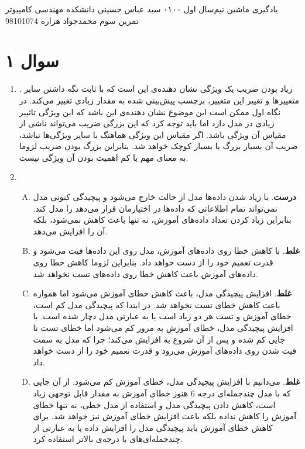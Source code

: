 \documentclass[a4paper, 12pt]{article}
\begin{document}
\handout
{یادگیری ماشین}
{نیم‌سال اول ۰۱\lr{-}۰۰}
{سید عباس حسینی}
{دانشکده مهندسی کامپیوتر}
{تمرین سوم}
{محمد‌جواد هزاره}
{98101074}
\noindent
\\ [-5em]
\section*{سوال ۱}
\begin{enumerate}
	\item \textbf{}.
	زیاد بودن ضریب یک ویژگی نشان دهنده‌ی این است که با ثابت نگه داشتن سایر متغییرها و تغییر این متغییر، برچسب پیش‌بینی شده به مقدار زیادی تغییر می‌کند. در نگاه اول ممکن است این موضوع نشان دهنده‌ی این باشد که این ویژگی تاثییر زیادی در مدل دارد اما باید توجه کرد که این بزرگی ضریب می‌تواند ناشی از مقیاس آن ویژگی باشد. اگر مقیاس این ویژگی هماهنگ با سایر ویژگی‌ها نباشد، ضریب آن بسیار بزرگ یا بسیار کوچک خواهد شد. بنابراین بزرگ بودن ضریب لزوما به معنای مهم یا کم‌ اهمیت بودن آن ویژگی نیست.
	\item
	\begin{enumerate}[A)]
		\item \textbf{درست}.
		با زیاد شدن داده‌ها مدل از حالت  خارج می‌شود و پیچیدگی کنونی مدل نمی‌تواند تمام اطلاعاتی که داده‌ها در اختیارمان قرار می‌دهد را مدل کند. بنابراین زیاد کردن تعداد داده‌های آموزش، نه تنها باعث کاهش  نمی‌شود، بلکه آن را افزایش می‌دهد.
		\item \textbf{غلط}.
		با کاهش خطا روی داده‌های آموزش، مدل روی این داده‌ها فیت می‌شود و قدرت تعمیم خود را از دست خواهد داد. بنابراین لزوما کاهش خطا روی داده‌های آموزش باعث کاهش خطا روی داده‌های تست نخواهد شد.
		\item \textbf{غلط}.
		افزایش پیچیدگی مدل، باعث کاهش خطای آموزش می‌شود اما همواره باعث کاهش خطای تست نخواهد شد. در ابتدا که پیچیدگی مدل کم است، خطای آموزش و تست هر دو زیاد است یا به عبارتی مدل دچار  شده است. با افزایش پیچیدگی مدل، خطای آموزش به مرور کم می‌شود اما خطای تست تا جایی کم شده و پس از آن شروع به افزایش می‌کند؛ چرا که مدل به سمت فیت شدن روی داده‌های آموزش می‌رود و قدرت تعمیم خود را از دست خواهد داد.
		\item \textbf{غلط}.
		می‌دانیم با افزایش پیچیدگی مدل، خطای آموزش کم می‌شود. از آن جایی که با مدل چندجمله‌ای درجه 6 هنوز خطای آموزش به مقدار قابل توجهی زیاد است، کاهش دادن پیچیدگی مدل و استفاده از مدل خطی، نه تنها خطای آموزش را کاهش نداده بلکه باعث افزایش خطای آموزش نیز خواهد شد. برای کاهش خطای آموزش باید پیچیدگی مدل را افزایش داده یا به عبارتی از چندجمله‌ای‌های با درجه‌ی بالاتر استفاده کرد.
	\end{enumerate}
\end{enumerate}
\end{document}
